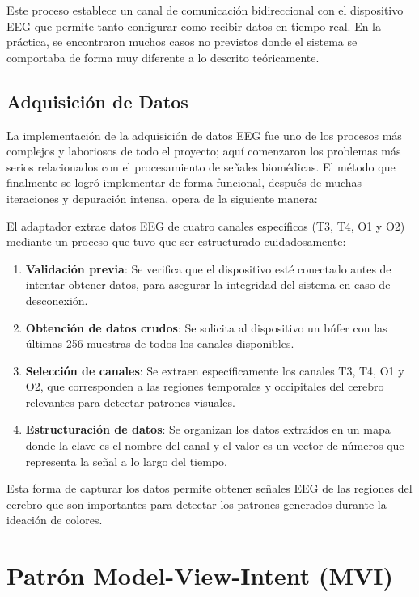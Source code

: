 Este proceso establece un canal de comunicación bidireccional con el dispositivo EEG que permite tanto configurar como recibir datos en tiempo real. En la práctica, se encontraron muchos casos no previstos donde el sistema se comportaba de forma muy diferente a lo descrito teóricamente.

\subsection{Adquisición de Datos}

La implementación de la adquisición de datos EEG fue uno de los procesos más complejos y laboriosos de todo el proyecto; aquí comenzaron los problemas más serios relacionados con el procesamiento de señales biomédicas. El método que finalmente se logró implementar de forma funcional, después de muchas iteraciones y depuración intensa, opera de la siguiente manera:

El adaptador extrae datos EEG de cuatro canales específicos (T3, T4, O1 y O2) mediante un proceso que tuvo que ser estructurado cuidadosamente:

\begin{enumerate}
    \item \textbf{Validación previa}: Se verifica que el dispositivo esté conectado antes de intentar obtener datos, para asegurar la integridad del sistema en caso de desconexión.
    
    \item \textbf{Obtención de datos crudos}: Se solicita al dispositivo un búfer con las últimas 256 muestras de todos los canales disponibles.
    
    \item \textbf{Selección de canales}: Se extraen específicamente los canales T3, T4, O1 y O2, que corresponden a las regiones temporales y occipitales del cerebro relevantes para detectar patrones visuales.
    
    \item \textbf{Estructuración de datos}: Se organizan los datos extraídos en un mapa donde la clave es el nombre del canal y el valor es un vector de números que representa la señal a lo largo del tiempo.
\end{enumerate}

Esta forma de capturar los datos permite obtener señales EEG de las regiones del cerebro que son importantes para detectar los patrones generados durante la ideación de colores.

\section{Patrón Model-View-Intent (MVI)}

